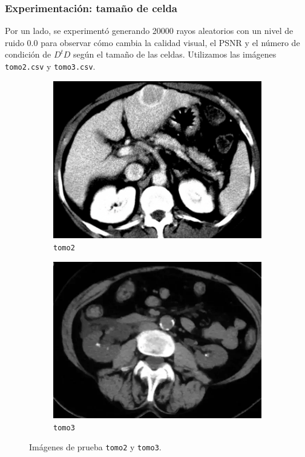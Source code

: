 \documentclass{beamer}
\begin{document}

\begin{frame}
\frametitle{Experimentación: tamaño de celda}
Por un lado, se experimentó generando 20000 rayos aleatorios con un nivel de ruido 0.0 para observar cómo cambia la calidad visual, 
el PSNR y el número de condición de $D^tD$ según el tamaño de las celdas. Utilizamos las imágenes \texttt{tomo2.csv} y \texttt{tomo3.csv}.

\begin{figure}
\centering
\begin{subfigure}{0.5\textwidth}
  \centering
  \includegraphics[width=0.8\linewidth]{tomo2}
  \caption{\texttt{tomo2}}
  \label{fig:sub1}
\end{subfigure}%
\begin{subfigure}{0.5\textwidth}
  \centering
  \includegraphics[width=0.8\linewidth]{tomo3}
  \caption{\texttt{tomo3}}
  \label{fig:sub2}
\end{subfigure}
\caption{Imágenes de prueba \texttt{tomo2} y \texttt{tomo3}.}
\label{fig:tomo23}
\end{figure}


\end{frame}
\end{document}
